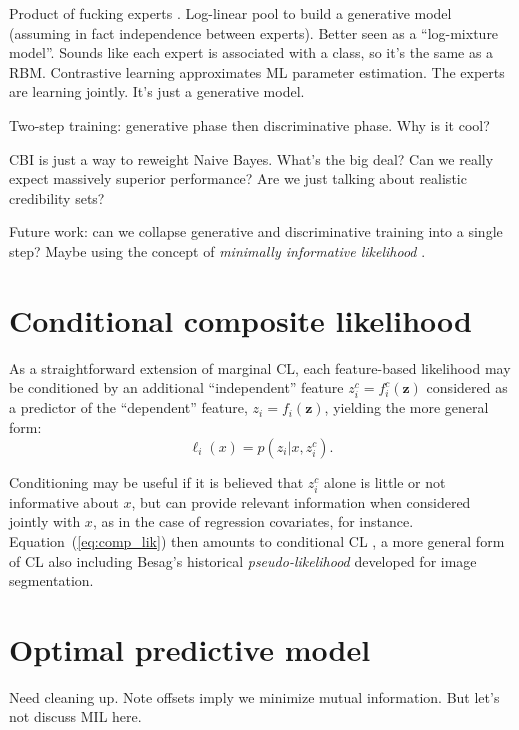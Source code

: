 \documentclass[english]{scrartcl}
\def\y{{\mathbf{y}}}
\def\y{{\mathbf{z}}}
\begin{document}
{\color{red}Product of fucking experts \cite{Hinton-02}. Log-linear pool to build a generative model (assuming in fact independence between experts). Better seen as a ``log-mixture model''. Sounds like each expert is associated with a class, so it's the same as a RBM. Contrastive learning approximates ML parameter estimation. The experts are learning jointly. It's just a generative model.}

{\color{red}Two-step training: generative phase then discriminative phase. Why is it cool?}

{\color{red}CBI is just a way to reweight Naive Bayes. What's the big deal? Can we really expect massively superior performance? Are we just talking about realistic credibility sets?}

Future work: can we collapse generative and discriminative training into a single step? Maybe using the concept of {\em minimally informative likelihood} \cite{Yuan-99b}.


\appendix

\section{Conditional composite likelihood}
\label{appendix:conditional}

As a straightforward  extension of marginal CL, each feature-based likelihood may be conditioned by an additional ``independent'' feature $z^c_i = f^c_i(\y)$ considered as a predictor of the ``dependent'' feature, $z_i=f_i(\y)$, yielding the more general form:
\begin{equation}
\label{eq:cond_feat_lik}
\ell_i(x) = p(z_i|x,z^c_i).
\end{equation}

Conditioning may be useful if it is believed that $z^c_i$ alone is little or not informative about $x$, but can provide relevant information when considered jointly with $x$, as in the case of regression covariates, for instance. Equation~(\ref{eq:comp_lik}) then amounts to conditional CL \cite{Varin-11}, a more general form of CL also including Besag's historical {\em pseudo-likelihood} \cite{Besag-74} developed for image segmentation.


\section{Optimal predictive model}
\label{appendix:maxent}

{\color{red} Need cleaning up. Note offsets imply we minimize mutual information. But let's not discuss MIL here.}
\end{document}
